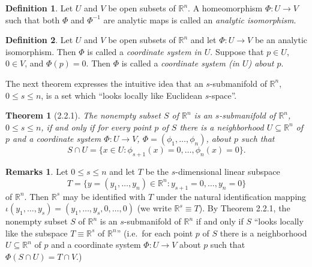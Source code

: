 \documentclass[11pt]{article}
\theoremstyle{plain}
\newtheorem*{theorem*}{Theorem}
\theoremstyle{definition}
\newtheorem*{definition}{Definition}
\newtheorem*{remarks}{Remarks}
\newcommand{\R}{\mathbb{R}}
\begin{document}
\begin{definition}
Let $U$ and $V$ be open subsets of $\R^n$. A homeomorphism
$\Phi: U \to V$ such that both $\Phi$ and $\Phi^{-1}$ are analytic maps
is called an \emph{analytic isomorphism}.
\end{definition}

\begin{definition}
Let $U$ and $V$ be open subsets of $\R^n$ and let $\Phi: U \to V$ be an
analytic isomorphism. Then $\Phi$ is called a \emph{coordinate system in
$U$}. Suppose that $p \in U$, $0 \in V$, and $\Phi(p) = 0$. Then $\Phi$
is called a \emph{coordinate system (in $U$) about $p$}.
\end{definition}

The next theorem expresses the intuitive idea that an $s$-submanifold of
$\R^n$, $0 \le s \le n$, is a set which ``looks locally like Euclidean
$s$-space''.

\begin{theorem*}[2.2.1]
The nonempty subset $S$ of $\R^n$ is an $s$-submanifold of $\R^n$,
$0 \le s \le n$, if and only if for every point $p$ of $S$ there is a
neighborhood $U \subseteq \R^n$ of $p$ and a coordinate system
$\Phi: U \to V$, $\Phi = (\phi_1, \ldots, \phi_n)$, about $p$ such that
\begin{equation}
S \cap U = \{ x \in U : \phi_{s+1}(x) = 0, \ldots, \phi_n(x) = 0 \}.
\tag{2.2.1}
\end{equation}
\end{theorem*}

\begin{remarks}
Let $0 \le s \le n$ and let $T$ be the $s$-dimensional linear subspace
\begin{equation}
T = \{ y = (y_1, \ldots, y_n) \in \R^n : y_{s+1} = 0, \ldots, y_n = 0 \}
\tag{2.2.2}
\end{equation}
of $\R^n$. Then $\R^s$ may be identified with $T$ under the natural
identification mapping
$\iota(y_1, \ldots, y_s) = (y_1, \ldots, y_s, 0, \ldots, 0)$ (we write
$\R^s \equiv T$). By Theorem 2.2.1, the nonempty subset $S$ of $\R^n$ is
an $s$-submanifold of $\R^n$ if and only if $S$ ``looks locally like the
subspace $T \equiv \R^s$ of $\R^n$'' (i.e.\ for each point $p$ of $S$
there is a neighborhood $U \subseteq \R^n$ of $p$ and a coordinate system
$\Phi: U \to V$ about $p$ such that $\Phi(S \cap U) = T \cap V$.)
\end{remarks}
\end{document}
